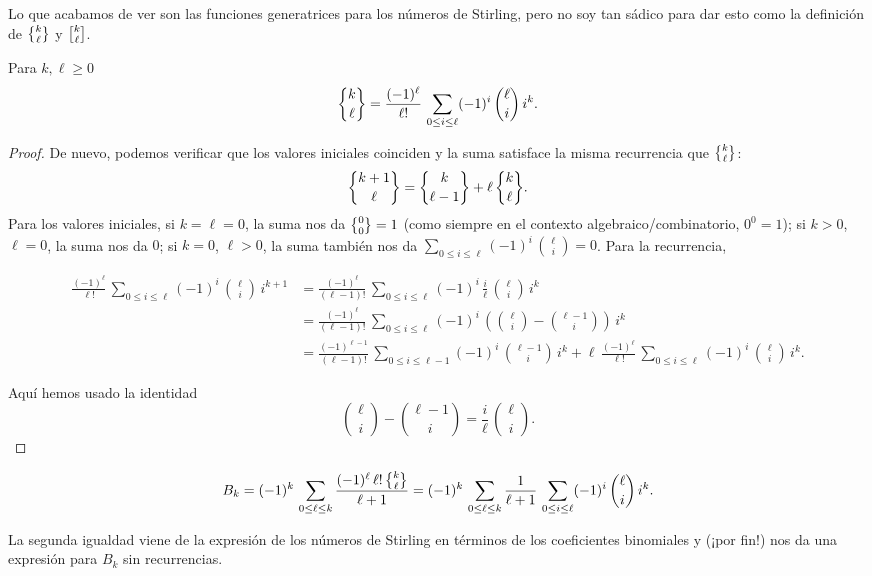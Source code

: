 \documentclass{article}
\begin{document}
Lo que acabamos de ver son las funciones generatrices para los números de Stirling, pero no soy tan sádico para dar esto como la definición de $\Stirling{k}{\ell}$ y $\stirling{k}{\ell}$.

\begin{lema*}
\label{stirling-via-binomial}
Para $k,\ell\ge 0$
$$\Stirling{k}{\ell} = \frac{(-1)^\ell}{\ell!}\,\sum_{0 \le i \le \ell} (-1)^i \, {\ell \choose i} \, i^k.$$

\begin{proof}
De nuevo, podemos verificar que los valores iniciales coinciden y la suma satisface la misma recurrencia que $\Stirling{k}{\ell}$:
$$\Stirling{k+1}{\ell} = \Stirling{k}{\ell-1} + \ell \, \Stirling{k}{\ell}.$$
Para los valores iniciales, si $k = \ell = 0$, la suma nos da $\Stirling{0}{0} = 1$ (como siempre en el contexto algebraico/combinatorio, $0^0 = 1$); si $k > 0$, $\ell = 0$, la suma nos da $0$; si $k = 0$, $\ell > 0$, la suma también nos da $\sum_{0 \le i \le \ell} (-1)^i \, {\ell\choose i} = 0$. Para la recurrencia,

\begin{align*}
\frac{(-1)^\ell}{\ell!}\,\sum_{0 \le i \le \ell} (-1)^i \, {\ell \choose i} \, i^{k+1} & = \frac{(-1)^\ell}{(\ell-1)!}\,\sum_{0 \le i \le \ell} (-1)^i \, \frac{i}{\ell}\, {\ell \choose i} \, i^k \\
 & = \frac{(-1)^\ell}{(\ell-1)!}\,\sum_{0 \le i \le \ell} (-1)^i \, \left({\ell \choose i} - {\ell - 1\choose i}\right) \, i^k \\
 & = \frac{(-1)^{\ell-1}}{(\ell-1)!}\,\sum_{0 \le i \le \ell-1} (-1)^i \, {\ell - 1 \choose i} \, i^k + \ell\,\frac{(-1)^\ell}{\ell!}\,\sum_{0 \le i \le \ell} (-1)^i \, {\ell \choose i} \, i^k.
\end{align*}

Aquí hemos usado la identidad
$${\ell \choose i} - {\ell - 1 \choose i} = \frac{i}{\ell}\,{\ell \choose i}.$$
\end{proof}
\end{lema*}

\begin{teorema*}
$$B_k = (-1)^k \, \sum_{0 \le \ell \le k} \frac{(-1)^\ell \, \ell! \, \Stirling{k}{\ell}}{\ell+1} = (-1)^k \, \sum_{0 \le \ell \le k} \frac{1}{\ell+1}\,\sum_{0 \le i \le \ell} (-1)^i \, {\ell \choose i} \, i^k.$$
\end{teorema*}

La segunda igualdad viene de la expresión de los números de Stirling en términos de los coeficientes binomiales y (¡por fin!) nos da una expresión para $B_k$ sin recurrencias.
\end{document}
